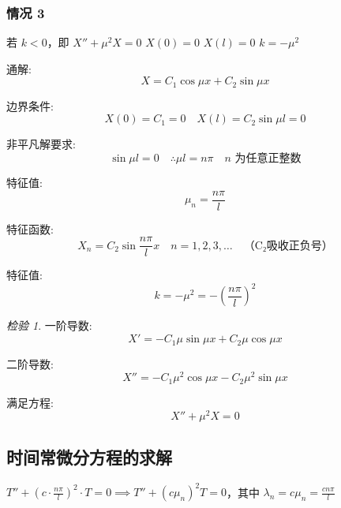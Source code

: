 \documentclass[12pt,a4paper]{article}
\numberwithin{subsection}{section}   %
\numberwithin{subsubsection}{subsection}
\theoremstyle{plain}
\theoremstyle{definition}
\theoremstyle{remark}
\theoremstyle{verification}
\newtheorem{verification}[theorem]{检验}
\begin{document}
	\subsubsection{情况 3} 
	若 \(k < 0\)，即 \(X'' + \mu^2 X = 0\) \quad \(X(0) = 0\) \quad \(X(l) = 0\) \quad \(k = -\mu^2\)
	
	通解:
	\begin{equation}
		X = C_1 \cos \mu x + C_2 \sin \mu x
	\end{equation}
	
	
	
	边界条件:
	\begin{equation}
		X(0) = C_1 = 0 \quad X(l) = C_2 \sin \mu l = 0
	\end{equation}
	
	非平凡解要求:
	\begin{equation}
		\sin \mu l = 0 \quad \therefore \mu l = n\pi \quad n \text{ 为任意正整数}
	\end{equation}
	
	特征值:
	\begin{equation}
		\mu_n = \frac{n\pi}{l}
	\end{equation}
	
	特征函数:
	\begin{equation}
		X_n = C_2 \sin \frac{n\pi}{l} x \quad n = 1, 2, 3, \ldots \quad \text{（C₂吸收正负号）}
	\end{equation}
	
	特征值:
	\begin{equation}
		k = -\mu^2 = -\left(\frac{n\pi}{l}\right)^2
	\end{equation}
	
	\begin{verification}	
		一阶导数:
		\begin{equation}
			X' = -C_1 \mu \sin \mu x + C_2 \mu \cos \mu x
		\end{equation}
		
		二阶导数:
		\begin{equation}
			X'' = -C_1 \mu^2 \cos \mu x - C_2 \mu^2 \sin \mu x
		\end{equation}
		
		满足方程:
		\begin{equation}
			X'' + \mu^2 X = 0
		\end{equation}
	\end{verification}	
	
	
	\subsection{时间常微分方程的求解}
	\(T'' + \left(c \cdot \frac{n\pi}{l}\right)^2 \cdot T = 0 \implies T'' + (c \mu_n)^2 T = 0\)，其中 \(\lambda_n = c \mu_n = \frac{c n \pi}{l}\)
	
\end{document}
